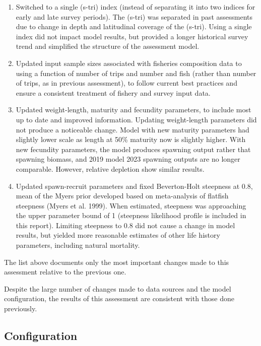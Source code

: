 \documentclass[
]{scrartcl}
\begin{document}
\begin{enumerate}
\item Switched to a single  (s-tri) index (instead of separating it into two indices for early and late survey periods). The  (s-tri) was separated in past assessments due to change in depth and latitudinal coverage of the  (s-tri). Using a single index did not impact model results, but provided a longer historical survey trend and simplified the structure of the assessment model.

\item Updated input sample sizes associated with fisheries composition data to using a function of number of trips and number and fish (rather than number of trips, as in previous assessment), to follow current best practices and ensure a consistent treatment of fishery and survey input data.

\item Updated weight-length, maturity and fecundity parameters, to include most up to date and improved information. Updating weight-length parameters did not produce a noticeable change. Model with new maturity parameters had slightly lower scale as length at 50\% maturity now is slightly higher. With new fecundity parameters, the model produces spawning output rather that spawning biomass, and 2019 model 2023 spawning outputs are no longer comparable. However, relative depletion show similar results.

\item Updated spawn-recruit parameters and fixed Beverton-Holt steepness at 0.8, mean of the Myers prior developed based on meta-analysis of flatfish steepness (Myers et al. 1999). When estimated, steepness was approaching the upper parameter bound of 1 (steepness likelihood profile is included in this report). Limiting steepness to 0.8 did not cause a change in model results, but yielded more reasonable estimates of other life history parameters, including natural mortality.

\end{enumerate}

The list above documents only the most important changes made to this
assessment relative to the previous one.

Despite the large number of changes made to data sources and the model
configuration, the results of this assessment are consistent with those
done previously.

\subsection{Configuration}\label{sec-configuration}
\end{document}
